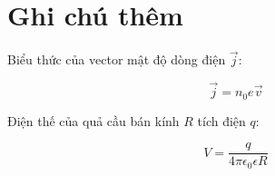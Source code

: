 \section{Ghi chú thêm}

Biểu thức của vector mật độ dòng điện $\vec{j}$:

\begin{equation*}
  \vec{j} = n_0e\vec{v}
\end{equation*}

Điện thế của quả cầu bán kính $R$ tích điện $q$:

\begin{equation*}
  V = \frac{q}{4\pi\epsilon_0\epsilon R}
\end{equation*}